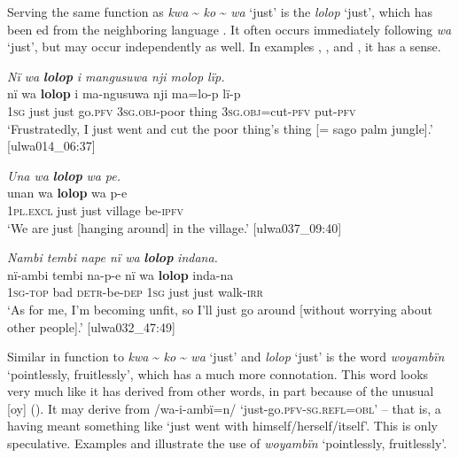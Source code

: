 Serving the same function as \textit{kwa} {\textasciitilde} \textit{ko} {\textasciitilde} \textit{wa} ‘just’ is the  \textit{lolop} ‘just’, which has been ed from the neighboring language . It often occurs immediately following \textit{wa} ‘just’, but may occur independently as well. In examples , , and , it has a  sense.

\ea%
    \label{ex:otherwc:134}
          \textit{Nï wa} \textbf{\textit{lolop}} \textit{i mangusuwa nji molop lïp.}\\
\gll    nï    wa  \textbf{lolop}  i    ma-ngusuwa  nji    ma=lo-p lï-p\\
    1\textsc{sg}  just  just    go.\textsc{pfv}  3\textsc{sg.obj-}poor  thing  \textsc{3sg.obj}=cut-\textsc{pfv}    put-\textsc{pfv}\\
\glt `Frustratedly, I just went and cut the poor thing’s thing [= sago palm jungle].’ [ulwa014\_06:37]
\z

\ea%
    \label{ex:otherwc:135}
            \textit{Una wa} \textbf{\textit{lolop}} \textit{wa pe.}\\
\gll    unan    wa  \textbf{lolop}  wa    p-e\\
    1\textsc{pl.excl}  just  just    village  be-\textsc{ipfv}\\
\glt `We are just [hanging around] in the village.’ [ulwa037\_09:40]
\z

\ea%
    \label{ex:otherwc:136}
          \textit{Nambi tembi nape nï wa} \textbf{\textit{lolop}} \textit{indana.}\\
\gll    nï-ambi  tembi  na-p-e      nï    wa  \textbf{lolop}  inda-na\\
    1\textsc{sg-top}  bad    \textsc{detr}{}-be-\textsc{dep}  1\textsc{sg}  just  just    walk-\textsc{irr}\\
\glt `As for me, I’m becoming unfit, so I’ll just go around [without worrying about other people].’ [ulwa032\_47:49]
\z

Similar in function to \textit{kwa} {\textasciitilde} \textit{ko} {\textasciitilde} \textit{wa} ‘just’ and \textit{lolop} ‘just’ is the word \textit{woyambïn} ‘pointlessly, fruitlessly’, which has a much more  connotation. This word looks very much like it has derived from other words, in part because of the unusual  [oy] (). It may derive from /wa-i-ambï=n/ ‘just-go.\textsc{pfv-sg.refl=obl’} -- that is, a  having meant something like ‘just went with himself/herself/itself’. This is only speculative. Examples  and  illustrate the use of \textit{woyambïn} ‘pointlessly, fruitlessly’.


